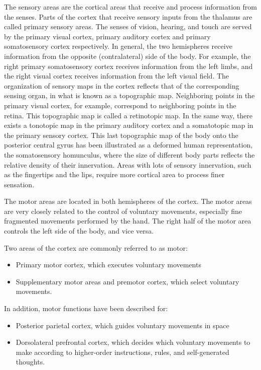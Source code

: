 The sensory areas are the cortical areas that receive and process information from the senses. Parts of the cortex that receive sensory inputs from the thalamus are called primary sensory areas. The senses of vision, hearing, and touch are served by the primary visual cortex, primary auditory cortex and primary somatosensory cortex respectively. In general, the two hemispheres receive information from the opposite (contralateral) side of the body. For example, the right primary somatosensory cortex receives information from the left limbs, and the right visual cortex receives information from the left visual field. The organization of sensory maps in the cortex reflects that of the corresponding sensing organ, in what is known as a topographic map. Neighboring points in the primary visual cortex, for example, correspond to neighboring points in the retina. This topographic map is called a retinotopic map. In the same way, there exists a tonotopic map in the primary auditory cortex and a somatotopic map in the primary sensory cortex. This last topographic map of the body onto the posterior central gyrus has been illustrated as a deformed human representation, the somatosensory homunculus, where the size of different body parts reflects the relative density of their innervation. Areas with lots of sensory innervation, such as the fingertips and the lips, require more cortical area to process finer sensation.

The motor areas are located in both hemispheres of the cortex. The motor areas are very closely related to the control of voluntary movements, especially fine fragmented movements performed by the hand. The right half of the motor area controls the left side of the body, and vice versa.

Two areas of the cortex are commonly referred to as motor:

\begin{itemize}
\tightlist
\item
  Primary motor cortex, which executes voluntary movements
\item
  Supplementary motor areas and premotor cortex, which select voluntary movements.
\end{itemize}

In addition, motor functions have been described for:

\begin{itemize}
\tightlist
\item
  Posterior parietal cortex, which guides voluntary movements in space
\item
  Dorsolateral prefrontal cortex, which decides which voluntary movements to make according to higher-order instructions, rules, and self-generated thoughts.
\end{itemize}

